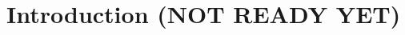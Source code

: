 \documentclass[opre,nonblindrev]{informs3} %
\begin{document}


\maketitle

%


\section{Introduction (NOT READY YET)}
\end{document}
